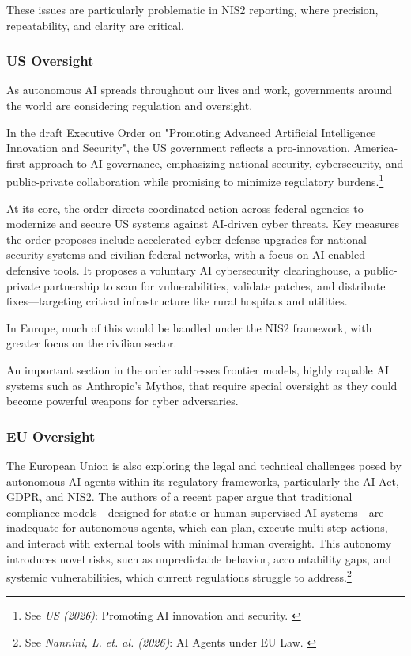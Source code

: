 These issues are particularly problematic in NIS2 reporting, where precision, repeatability, and clarity are critical.

\subsubsection{US Oversight}

As autonomous AI spreads throughout our lives and work, governments around the world are considering regulation and oversight.

In the draft Executive Order on "Promoting Advanced Artificial Intelligence Innovation and Security", the US government reflects a pro-innovation, America-first approach to AI governance, emphasizing national security, cybersecurity, and public-private collaboration while promising to minimize regulatory burdens.\footnote{See \textit{US (2026)}: Promoting AI innovation and security. \cite{draftUS}}

At its core, the order directs coordinated action across federal agencies to modernize and secure US systems against AI-driven cyber threats. Key measures the order proposes include accelerated cyber defense upgrades for national security systems and civilian federal networks, with a focus on AI-enabled defensive tools. It proposes a voluntary AI cybersecurity clearinghouse, a public-private partnership to scan for vulnerabilities, validate patches, and distribute fixes—targeting critical infrastructure like rural hospitals and utilities. 

In Europe, much of this would be handled under the NIS2 framework, with greater focus on the civilian sector.

An important section in the order addresses frontier models, highly capable AI systems such as Anthropic's Mythos, that require special oversight as they could become powerful weapons for cyber adversaries.

\subsubsection{EU Oversight}

The European Union is also exploring the legal and technical challenges posed by autonomous AI agents within its regulatory frameworks, particularly the AI Act, GDPR, and NIS2. The authors of a recent paper argue that traditional compliance models—designed for static or human-supervised AI systems—are inadequate for autonomous agents, which can plan, execute multi-step actions, and interact with external tools with minimal human oversight. This autonomy introduces novel risks, such as unpredictable behavior, accountability gaps, and systemic vulnerabilities, which current regulations struggle to address.\footnote{See \textit{Nannini, L. et. al. (2026)}: AI Agents under EU Law. \cite{nannini2026}}


